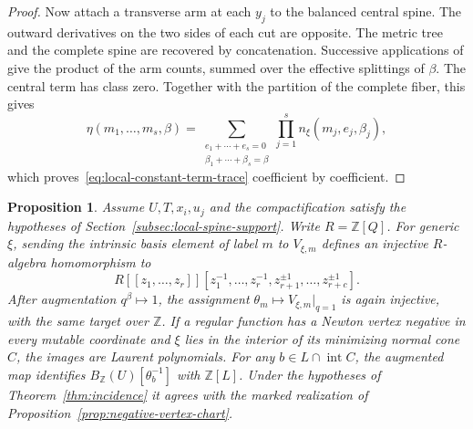 \documentclass[11pt,reqno]{amsart}
\numberwithin{equation}{section}
\newtheorem{proposition}[theorem]{Proposition}
\theoremstyle{definition}
\theoremstyle{remark}
\begin{document}
\begin{proof}
Now attach a transverse arm at each \(y_j\) to the balanced central
spine. The outward derivatives on the two sides of each cut are
opposite. The metric tree and the complete spine are recovered
by concatenation. Successive applications of \cite[Theorem~12.4]{KY}
give the product of the arm counts, summed over the effective splittings
of \(\beta\). The central term has class zero. Together with the
partition of the complete fiber, this gives
\[ \eta(m_1,\ldots,m_s,\beta)= \sum_{\substack{e_1+\cdots+e_s=0\\ \beta_1+\cdots+\beta_s=\beta}} \prod_{j=1}^s n_{\xi}(m_j,e_j,\beta_j), \]
which proves~\eqref{eq:local-constant-term-trace} coefficient by coefficient.
\end{proof}

\begin{proposition}\label{prop:formal-local-chart}
Assume \(U,T,x_i,u_j\) and the compactification satisfy the hypotheses
of Section~\ref{subsec:local-spine-support}. Write \(R=\mathbb Z[Q]\).
For generic \(\xi\), sending the intrinsic basis element of label \(m\)
to \(V_{\xi,m}\) defines an injective \(R\)-algebra homomorphism to
\[ R[[z_1,\ldots,z_r]][z_1^{-1},\ldots,z_r^{-1},z_{r+1}^{\pm1},\ldots,z_{r+c}^{\pm1}]. \]
After augmentation \(q^\beta\mapsto1\), the assignment
\(\theta_m\mapsto V_{\xi,m}|_{q=1}\) is again injective, with the same
target over \(\mathbb Z\). If a regular function has a Newton
vertex negative in every mutable coordinate and \(\xi\) lies in the
interior of its minimizing normal cone \(C\), the images are Laurent
polynomials. For any \(b\in L\cap\operatorname{int}C\), the augmented
map identifies \(B_{\mathbb Z}(U)[\theta_b^{-1}]\) with \(\mathbb Z[L]\).
Under the hypotheses of Theorem~\ref{thm:incidence} it agrees with
the marked realization of Proposition~\ref{prop:negative-vertex-chart}.
\end{proposition}
\end{document}
